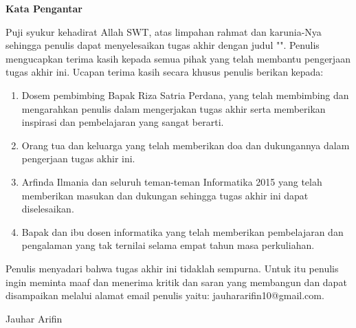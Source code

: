 \clearpage

\begin{center}
    \Large \bfseries Kata Pengantar
\end{center}

\par Puji syukur kehadirat Allah SWT, atas limpahan rahmat dan karunia-Nya sehingga penulis dapat menyelesaikan tugas akhir dengan judul "\thetitle". Penulis mengucapkan terima kasih kepada semua pihak yang telah membantu pengerjaan tugas akhir ini. Ucapan terima kasih secara khusus penulis berikan kepada:

\begin{enumerate}
    \item Dosem pembimbing Bapak Riza Satria Perdana, yang telah membimbing dan mengarahkan penulis dalam mengerjakan tugas akhir serta memberikan inspirasi dan pembelajaran yang sangat berarti.
    \item Orang tua dan keluarga yang telah memberikan doa dan dukungannya dalam pengerjaan tugas akhir ini.
    \item Arfinda Ilmania dan seluruh teman-teman Informatika 2015 yang telah memberikan masukan dan dukungan sehingga tugas akhir ini dapat diselesaikan.
    \item Bapak dan ibu dosen informatika yang telah memberikan pembelajaran dan pengalaman yang tak ternilai selama empat tahun masa perkuliahan.
\end{enumerate}

\par Penulis menyadari bahwa tugas akhir ini tidaklah sempurna. Untuk itu penulis ingin meminta maaf dan menerima kritik dan saran yang membangun dan dapat disampaikan melalui alamat email penulis yaitu: jauhararifin10@gmail.com.

\begin{flushright}
Jauhar Arifin
\end{flushright}

\clearpage